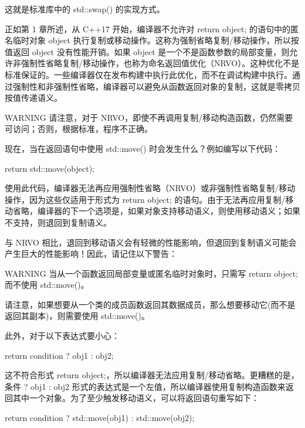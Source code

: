 这就是标准库中的 std::swap() 的实现方式。


正如第 1 章所述，从 C++17 开始，编译器不允许对 return object; 的语句中的匿名临时对象 object 执行复制或移动操作。这称为强制省略复制/移动操作，所以按值返回 object 没有性能开销。如果 object 是一个不是函数参数的局部变量，则允许非强制性省略复制/移动操作，也称为命名返回值优化（NRVO）。这种优化不是标准保证的。一些编译器仅在发布构建中执行此优化，而不在调试构建中执行。通过强制性和非强制性省略，编译器可以避免从函数返回对象的复制，这就是零拷贝按值传递语义。

\begin{myWarning}{WARNING}
请注意，对于 NRVO，即使不再调用复制/移动构造函数，仍然需要可访问；否则，根据标准，程序不正确。
\end{myWarning}

现在，当在返回语句中使用 std::move() 时会发生什么？例如编写以下代码：

\begin{cpp}
return std::move(object);
\end{cpp}

使用此代码，编译器无法再应用强制性省略（NRVO）或非强制性省略复制/移动操作，因为这些仅适用于形式为 return object; 的语句。由于无法再应用复制/移动省略，编译器的下一个选项是，如果对象支持移动语义，则使用移动语义；如果不支持，则退回到复制语义。

与 NRVO 相比，退回到移动语义会有轻微的性能影响，但退回到复制语义可能会产生巨大的性能影响！因此，请记住以下警告：

\begin{myWarning}{WARNING}
当从一个函数返回局部变量或匿名临时对象时，只需写 return object; 而不使用 std::move()。
\end{myWarning}

请注意，如果想要从一个类的成员函数返回其数据成员，那么想要移动它(而不是返回其副本)，则需要使用 std::move()。

此外，对于以下表达式要小心：

\begin{cpp}
return condition ? obj1 : obj2;
\end{cpp}

这不符合形式 return object;，所以编译器无法应用复制/移动省略。更糟糕的是，条件 ? obj1 : obj2 形式的表达式是一个左值，所以编译器使用复制构造函数来返回其中一个对象。为了至少触发移动语义，可以将返回语句重写如下：

\begin{cpp}
return condition ? std::move(obj1) : std::move(obj2);
\end{cpp}


